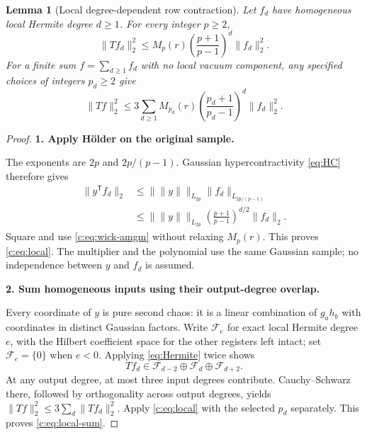 \documentclass[11pt]{article}
\numberwithin{equation}{section}
\newtheorem{lemma}[theorem]{Lemma}
\theoremstyle{definition}\newtheorem{definition}[theorem]{Definition}
\theoremstyle{remark}\newtheorem{remark}[theorem]{Remark}
\newcommand{\norm}[1]{\lVert#1\rVert}\newcommand{\ip}[2]{\langle#1,#2\rangle}
\newcommand{\step}[1]{\par\addvspace{.65\baselineskip}\Needspace{4\baselineskip}\noindent\textbf{#1}\par\nobreak\smallskip}
\begin{document}
\begin{lemma}[Local degree-dependent row contraction]\label{c:lem:local}
Let $f_d$ have homogeneous local Hermite degree $d\ge1$. For every integer $p\ge2$,
\begin{equation}\label{c:eq:local}
 \boxed{\norm{Tf_d}_2^2\le
 M_p(r)\left(\frac{p+1}{p-1}\right)^d\norm{f_d}_2^2.}
\end{equation}
For a finite sum $f=\sum_{d\ge1}f_d$ with no local vacuum component, any
specified choices of integers $p_d\ge2$ give
\begin{equation}\label{c:eq:local-sum}
 \norm{Tf}_2^2\le3\sum_{d\ge1}
 M_{p_d}(r)\left(\frac{p_d+1}{p_d-1}\right)^d\norm{f_d}_2^2.
\end{equation}
\end{lemma}
\begin{proof}
\step{1. Apply H\"older on the original sample.}
The exponents are $2p$ and $2p/(p-1)$. Gaussian hypercontractivity
\eqref{eq:HC} therefore gives
\begin{align*}
 \norm{y^{\mathsf T}f_d}_2
 &\le\bigl\|\norm y\bigr\|_{L_{2p}}\norm{f_d}_{L_{2p/(p-1)}}\\
 &\le\bigl\|\norm y\bigr\|_{L_{2p}}
 \left(\frac{p+1}{p-1}\right)^{d/2}\norm{f_d}_2.
\end{align*}
Square and use \eqref{c:eq:wick-amgm} without relaxing $M_p(r)$. This proves
\eqref{c:eq:local}. The multiplier and the polynomial use the same Gaussian
sample; no independence between $y$ and $f_d$ is assumed.

\step{2. Sum homogeneous inputs using their output-degree overlap.}
Every coordinate of $y$ is pure second chaos: it is a linear combination of
$g_a h_b$ with coordinates in distinct Gaussian factors. Write $\mathcal F_e$
for exact local Hermite degree $e$, with the Hilbert coefficient space for the
other registers left intact; set $\mathcal F_e=\{0\}$ when $e<0$.
Applying \eqref{eq:Hermite} twice shows
\[
 Tf_d\in\mathcal F_{d-2}\oplus\mathcal F_d\oplus\mathcal F_{d+2}.
\]
At any output degree, at most three input degrees contribute.
Cauchy--Schwarz there, followed by orthogonality across output degrees, yields
$\norm{Tf}_2^2\le3\sum_d\norm{Tf_d}_2^2$. Apply \eqref{c:eq:local}
with the selected $p_d$ separately. This proves \eqref{c:eq:local-sum}.
\end{proof}
\end{document}
